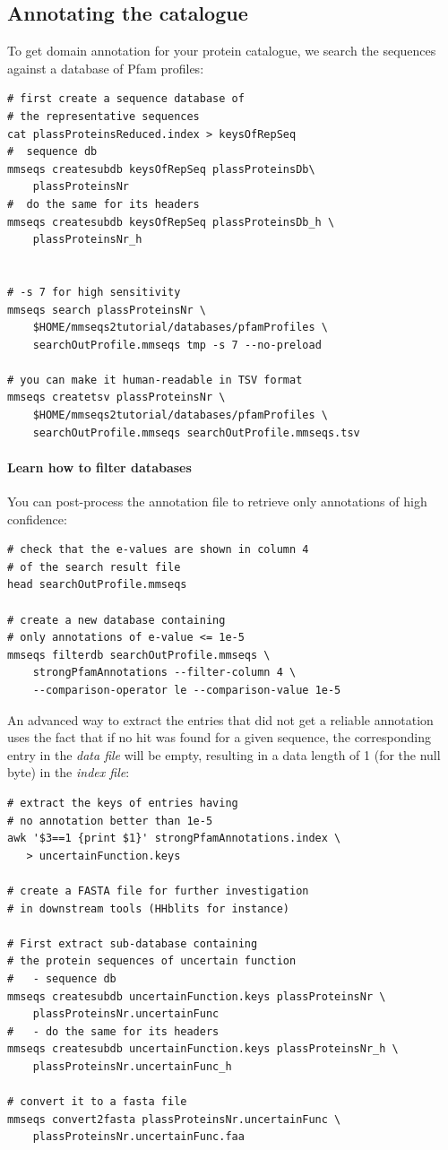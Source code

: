 \documentclass{scrartcl}
\begin{document}
\subsection{Annotating the catalogue}
To get domain annotation for your protein catalogue, we search the sequences against a database of Pfam profiles:
\begin{verbatim}
# first create a sequence database of
# the representative sequences
cat plassProteinsReduced.index > keysOfRepSeq
#  sequence db
mmseqs createsubdb keysOfRepSeq plassProteinsDb\
    plassProteinsNr
#  do the same for its headers
mmseqs createsubdb keysOfRepSeq plassProteinsDb_h \
    plassProteinsNr_h


# -s 7 for high sensitivity
mmseqs search plassProteinsNr \
    $HOME/mmseqs2tutorial/databases/pfamProfiles \
    searchOutProfile.mmseqs tmp -s 7 --no-preload

# you can make it human-readable in TSV format
mmseqs createtsv plassProteinsNr \
    $HOME/mmseqs2tutorial/databases/pfamProfiles \
    searchOutProfile.mmseqs searchOutProfile.mmseqs.tsv
\end{verbatim}


\paragraph{Learn how to filter databases}
You can post-process the annotation file to retrieve only annotations of high confidence:
\begin{verbatim}
# check that the e-values are shown in column 4
# of the search result file
head searchOutProfile.mmseqs

# create a new database containing
# only annotations of e-value <= 1e-5
mmseqs filterdb searchOutProfile.mmseqs \
    strongPfamAnnotations --filter-column 4 \
    --comparison-operator le --comparison-value 1e-5
\end{verbatim}

An advanced way to extract the entries that did not get a reliable annotation uses the fact that if no hit was found for a given sequence, the corresponding entry in the \textit{data file} will be empty, resulting in a data length of 1 (for the null byte) in the \textit{index file}:
\begin{verbatim}
# extract the keys of entries having
# no annotation better than 1e-5
awk '$3==1 {print $1}' strongPfamAnnotations.index \
   > uncertainFunction.keys

# create a FASTA file for further investigation
# in downstream tools (HHblits for instance)

# First extract sub-database containing
# the protein sequences of uncertain function
#   - sequence db
mmseqs createsubdb uncertainFunction.keys plassProteinsNr \
    plassProteinsNr.uncertainFunc
#   - do the same for its headers
mmseqs createsubdb uncertainFunction.keys plassProteinsNr_h \
    plassProteinsNr.uncertainFunc_h

# convert it to a fasta file
mmseqs convert2fasta plassProteinsNr.uncertainFunc \
    plassProteinsNr.uncertainFunc.faa
\end{verbatim}
\end{document}
